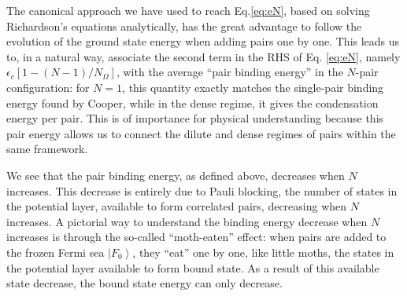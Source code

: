 \documentclass[aps,prb,superscriptaddress,showpacs,reprint,lengthcheck]{revtex4-1}
\begin{document}
The canonical approach we have used to reach Eq.\eqref{eq:eN}, based on solving 
Richardson's equations analytically, has the great advantage to follow the evolution of the
ground state energy when adding pairs one by one. This leads us to, in a natural way, 
associate the second term in the RHS of Eq.%
\eqref{eq:eN}, namely $\epsilon _{c}\left[ 1-\left( N-1\right) /N_{\Omega }%
\right] $, with the average ``pair binding energy'' in the $N$-pair configuration: for $N=1$, this quantity exactly matches the
single-pair binding energy found by Cooper, while in the dense regime, it 
gives the condensation energy per pair. This is of importance for physical understanding because this pair energy
allows us to connect the dilute and dense regimes of pairs within the same framework.

We see that the pair binding energy, as defined
above, decreases when $N$ increases. This decrease is entirely due to
Pauli blocking, the number of  states in
the potential layer, available to form correlated pairs, decreasing when $N$ increases. 
A pictorial way to
understand the binding energy decrease when $N$ increases is through the
so-called ``moth-eaten'' effect: when pairs are added to the frozen Fermi sea $\left\vert
F_{0}\right\rangle $, they ``eat'' one by one, like little moths, the
states in the potential layer available to form  bound state. As
a result of this available state decrease, the bound state energy can only
decrease. 
\end{document}
